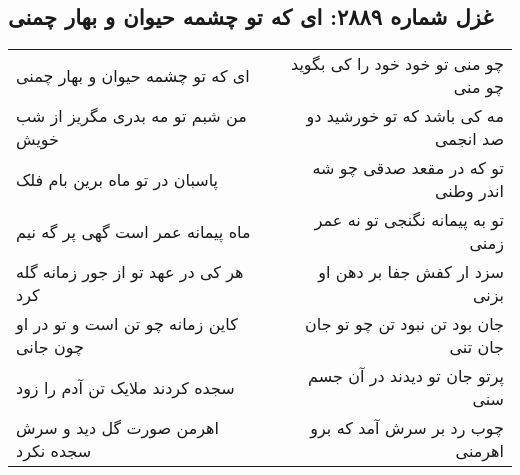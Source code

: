 \begin{center}
\section*{غزل شماره ۲۸۸۹: ای که تو چشمه حیوان و بهار چمنی}
\label{sec:2889}
\begin{longtable}{l p{0.5cm} r}
ای که تو چشمه حیوان و بهار چمنی
&&
چو منی تو خود خود را کی بگوید چو منی
\\
من شبم تو مه بدری مگریز از شب خویش
&&
مه کی باشد که تو خورشید دو صد انجمی
\\
پاسبان در تو ماه برین بام فلک
&&
تو که در مقعد صدقی چو شه اندر وطنی
\\
ماه پیمانه عمر است گهی پر گه نیم
&&
تو به پیمانه نگنجی تو نه عمر زمنی
\\
هر کی در عهد تو از جور زمانه گله کرد
&&
سزد ار کفش جفا بر دهن او بزنی
\\
کاین زمانه چو تن است و تو در او چون جانی
&&
جان بود تن نبود تن چو تو جان جان تنی
\\
سجده کردند ملایک تن آدم را زود
&&
پرتو جان تو دیدند در آن جسم سنی
\\
اهرمن صورت گل دید و سرش سجده نکرد
&&
چوب رد بر سرش آمد که برو اهرمنی
\\
\end{longtable}
\end{center}
